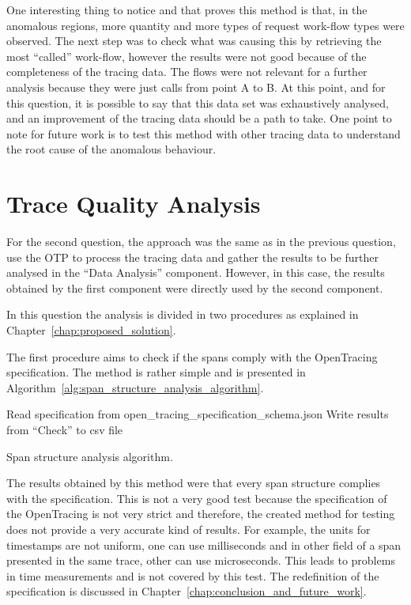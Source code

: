One interesting thing to notice and that proves this method is that, in the anomalous regions, more quantity and more types of request work-flow types were observed. The next step was to check what was causing this by retrieving the most ``called'' work-flow, however the results were not good because of the completeness of the tracing data. The flows were not relevant for a further analysis because they were just calls from point A to B. At this point, and for this question, it is possible to say that this data set was exhaustively analysed, and an improvement of the tracing data should be a path to take. One point to note for future work is to test this method with other tracing data to understand the root cause of the anomalous behaviour.

\section{Trace Quality Analysis}
\label{sec:trace_quality_analysis}

For the second question, the approach was the same as in the previous question, use the OTP to process the tracing data and gather the results to be further analysed in the ``Data Analysis'' component. However, in this case, the results obtained by the first component were directly used by the second component.

In this question the analysis is divided in two procedures as explained in Chapter~\ref{chap:proposed_solution}.

The first procedure aims to check if the spans comply with the OpenTracing specification. The method is rather simple and is presented in Algorithm~\ref{alg:span_structure_analysis_algorithm}.

\begin{algorithm}
  Read specification from open\_tracing\_specification\_schema.json\;
  Write results from ``Check'' to \gls{csv} file\;
  \caption{Span structure analysis algorithm.}
  \label{alg:span_structure_analysis_algorithm_2}
\end{algorithm}

The results obtained by this method were that every span structure complies with the specification. This is not a very good test because the specification of the OpenTracing is not very strict and therefore, the created method for testing does not provide a very accurate kind of results. For example, the units for timestamps are not uniform, one can use milliseconds and in other field of a span presented in the same trace, other can use microseconds. This leads to problems in time measurements and is not covered by this test. The redefinition of the specification is discussed in Chapter~\ref{chap:conclusion_and_future_work}.

